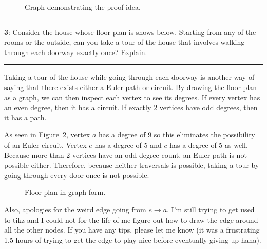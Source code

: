 \documentclass[11pt]{article}
\newcommand\question[2]{\vspace{.25in}\hrule\textbf{#1}: #2\vspace{.5em}\hrule\vspace{.10in}}
\begin{document}
\begin{figure}[ht]
	\centering
	\caption{Graph demonstrating the proof idea.}
	\label{numtwo}
\end{figure}


\question{3}{Consider the house whose floor plan is shows below. Starting from any of the rooms or the outside, can you take a tour of the house that involves walking through each doorway exactly once? Explain.}

Taking a tour of the house while going through each doorway is another way of saying that there exists either a Euler path or circuit. By drawing the floor plan as a graph, we can then inspect each vertex to see its degrees. If every vertex has an even degree, then it has a circuit. If exactly 2 vertices have odd degrees, then it has a path. 

As seen in Figure~\ref{floorplan}, vertex $a$ has a degree of 9 so this eliminates the possibility of an Euler circuit. Vertex $e$ has a degree of 5 and $c$ has a degree of 5 as well. Because more than 2 vertices have an odd degree count, an Euler path is not possible either. Therefore, because neither traversals is possible, taking a tour by going through every door once is not possible.

\begin{figure}[ht]
	\centering
	\caption{Floor plan in graph form.}
	\label{floorplan}
\end{figure}

Also, apologies for the weird edge going from $e \rightarrow a$, I'm still trying to get used to tikz and I could not for the life of me figure out how to draw the edge around all the other nodes. If you have any tips, please let me know (it was a frustrating 1.5 hours of trying to get the edge to play nice before eventually giving up haha).

	
\end{document}
